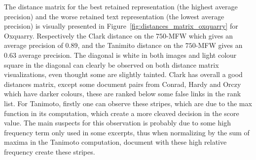 The distance matrix for the best retained representation (the highest average precision) and the worse retained text representation (the lowest average precision) is visually presented in Figure~\ref{fig:distances_matrix_oxquarry} for Oxquarry.
Respectively the Clark distance on the $750$-MFW which gives an average precision of $0.89$, and the Tanimito distance on the $750$-MFW gives an $0.63$ average precision.
The diagonal is white in both images and light colour square in the diagonal can clearly be observed on both distance matrix visualizations, even thought some are slightly tainted.
Clark has overall a good distances matrix, except some document pairs from Conrad, Hardy and Orczy which have darker colours, these are ranked below some false links in the rank list.
For Tanimoto, firstly one can observe these stripes, which are due to the max function in its computation, which create a more cleaved decision in the score value.
The main suspects for this observation is probably due to some high frequency term only used in some excerpts, thus when normalizing by the sum of maxima in the Tanimoto computation, document with these high relative frequency create these stripes.

